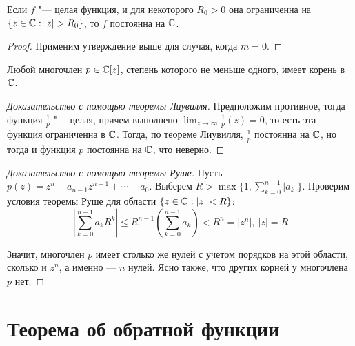 \begin{corollary}
	Если $f$ "--- целая функция, и для некоторого $R_0 > 0$ она ограниченна на $\{z \in \mathbb{C}: |z| > R_0\}$, то $f$ постоянна на $\mathbb{C}$.
\end{corollary}

\begin{proof}
	Применим утверждение выше для случая, когда $m = 0$.
\end{proof}

\begin{theorem}
	Любой многочлен $p \in \mathbb{C}[z]$, степень которого не меньше одного, имеет корень в $\mathbb{C}$.
\end{theorem}

\begin{proof}[Доказательство с помощью теоремы Лиувилля]
	Предположим противное, тогда функция $\frac 1p$ "--- целая, причем выполнено $\lim_{z \to \infty} \frac1p(z) = 0$, то есть эта функция ограниченна в $\mathbb{C}$. Тогда, по теореме Лиувилля, $\frac 1p$ постоянна на $\mathbb{C}$, но тогда и функция $p$ постоянна на $\mathbb{C}$, что неверно.
\end{proof}

\begin{proof}[Доказательство с помощью теоремы Руше]
	Пусть $p(z) = z^n + a_{n-1}z^{n-1} + \dotsb + a_0$. Выберем $R > \max\{1, \sum_{k = 0}^{n-1} |a_k|\}$. Проверим условия теоремы Руше для области $\{z \in \mathbb{C}: |z| < R\}$: 
	\[\left|\sum_{k = 0}^{n-1}a_kR^k\right| \le R^{n-1}\left(\sum_{k = 0}^{n-1}a_k\right) < R^n = |z^n|,~|z| = R\]
	
	Значит, многочлен $p$ имеет столько же нулей с учетом порядков на этой области, сколько и $z^n$, а именно --- $n$ нулей. Ясно также, что других корней у многочлена $p$ нет.
\end{proof}

\section{Теорема об обратной функции}

